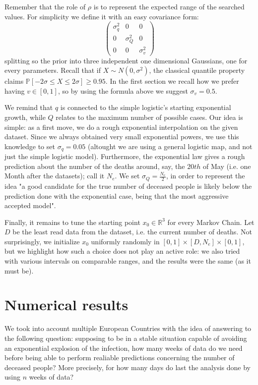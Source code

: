 \documentclass[8pt]{article}
\begin{document}
Remember that the role of $\rho$
is to represent the expected range of the searched values.
For simplicity we define it with an easy covariance form:
\begin{equation}
\begin{pmatrix}
	\sigma_q^2 & 0 & 0 \\
	0 & \sigma_Q^2 & 0 \\
	0 & 0 & \sigma_v^2
\end{pmatrix}
\end{equation}
splitting so the prior into three independent one dimensional Gaussians,
one for
every parameters. Recall that if $X \sim N(0,\sigma^2)$, the classical
quantile property claims 
$\mathbb{P}[-2 \sigma \leq X \leq 2 \sigma] \geq 0.95$.
In the first section we recall how we prefer having $v \in [0,1]$, so by
using the formula above we suggest $\sigma_v = 0.5$.

We remind that $q$ is connected to the simple logistic's
 starting exponential growth, while $Q$ 
relates to the maximum number of possible cases. 
Our idea is simple: as a first move,
we do a rough exponential interpolation on the given dataset. 
Since we always obtained very small exponential powers,
we use this knowledge to set  $\sigma_q = 0.05$
(altought we are using a general logistic map, and not just the
simple logistic model).
Furthermore, the exponential law gives a rough
prediction about the number of the deaths around, say, the $20th$ of May
(i.e. one Month after the datasets); call it $N_e$.
We set $\sigma_Q = \frac{N_e}{2}$, in order to represent the idea
"a good candidate for the true number of deceased people is likely
below the prediction done with the exponential case, being that the
most aggressive accepted model".


Finally, it remains to tune the starting point $x_0 \in \mathbb{R}^3$
for every Markov Chain. Let $D$ be
the least read data from the dataset, i.e. the current
number of deaths.
Not surprisingly, we initialize $x_0$ uniformly randomly in
$[0, 1] \times [D, N_e] \times [0,1]$, but we highlight how such a choice
does not play an active role: we also tried with various intervals on 
comparable ranges, and the results were the same (as it must be).


\section{Numerical results}
We took into account multiple European Countries with the idea of
answering to the following question:
supposing to be in a stable situation capable of avoiding
an exponential explosion of the infection, how many weeks of data do we need
before being able to perform realiable predictions concerning the
number of deceased people?
More precisely, for how many days do last the analysis done by using
$n$ weeks of data?
\end{document}
